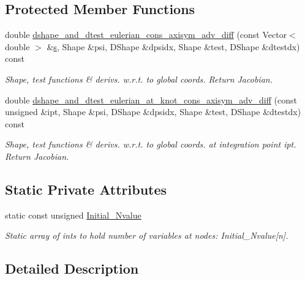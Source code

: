 \subsection*{Protected Member Functions}
\begin{DoxyCompactItemize}
\item 
double \hyperlink{classQGeneralisedAxisymAdvectionDiffusionElement_ae0fbfa30e85f9a3fdc53b62c24a18395}{dshape\+\_\+and\+\_\+dtest\+\_\+eulerian\+\_\+cons\+\_\+axisym\+\_\+adv\+\_\+diff} (const Vector$<$ double $>$ \&\hyperlink{cfortran_8h_ab7123126e4885ef647dd9c6e3807a21c}{s}, Shape \&psi, D\+Shape \&dpsidx, Shape \&test, D\+Shape \&dtestdx) const
\begin{DoxyCompactList}\small\item\em Shape, test functions \& derivs. w.\+r.\+t. to global coords. Return Jacobian. \end{DoxyCompactList}\item 
double \hyperlink{classQGeneralisedAxisymAdvectionDiffusionElement_a78eca532d205360e75d634283b53b1b5}{dshape\+\_\+and\+\_\+dtest\+\_\+eulerian\+\_\+at\+\_\+knot\+\_\+cons\+\_\+axisym\+\_\+adv\+\_\+diff} (const unsigned \&ipt, Shape \&psi, D\+Shape \&dpsidx, Shape \&test, D\+Shape \&dtestdx) const
\begin{DoxyCompactList}\small\item\em Shape, test functions \& derivs. w.\+r.\+t. to global coords. at integration point ipt. Return Jacobian. \end{DoxyCompactList}\end{DoxyCompactItemize}
\subsection*{Static Private Attributes}
\begin{DoxyCompactItemize}
\item 
static const unsigned \hyperlink{classQGeneralisedAxisymAdvectionDiffusionElement_a56731006b4970e2a38efa586df3190ac}{Initial\+\_\+\+Nvalue}
\begin{DoxyCompactList}\small\item\em Static array of ints to hold number of variables at nodes\+: Initial\+\_\+\+Nvalue\mbox{[}n\mbox{]}. \end{DoxyCompactList}\end{DoxyCompactItemize}


\subsection{Detailed Description}
